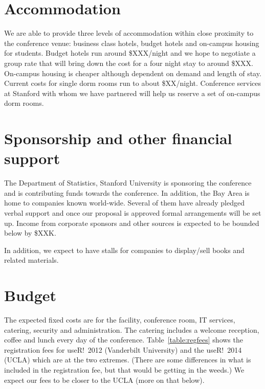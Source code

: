 \documentclass[11pt]{article}
\begin{document}
\section*{Accommodation}
We are able to provide three levels of accommodation within close
proximity to the conference venue: business class hotels, budget
hotels and on-campus housing for students. Budget hotels run around
\$XXX/night and we hope to negotiate a group rate that will bring down
the cost for a four night stay to around \$XXX. On-campus housing is
cheaper although dependent on demand and length of stay. Current costs
for single dorm rooms run to about \$XX/night. Conference services at
Stanford with whom we have partnered will help us reserve a set of
on-campus dorm rooms.

\section*{Sponsorship and other financial support}
The Department of Statistics, Stanford University is sponsoring the
conference and is contributing funds towards the conference. In
addition, the Bay Area is home to companies known world-wide. Several
of them have already pledged verbal support and once our proposal is
approved formal arrangements will be set up. Income from corporate
sponsors and other sources is expected to be bounded below by \$XXK.

In addition, we expect to have stalls for companies to display/sell
books and related materials.

\section*{Budget}
The expected fixed costs are for the facility, conference room, IT
services, catering, security and administration. The catering includes
a welcome reception, coffee and lunch every day of the
conference. Table~\ref{table:regfees} shows the registration fees for
useR!~2012 (Vanderbilt University) and the useR!~2014 (UCLA) which are
at the two extremes. (There are some differences in what is included
in the registration fee, but that would be getting in the weeds.) We
expect our fees to be closer to the UCLA (more on that below).
\end{document}
